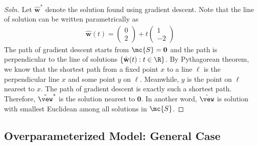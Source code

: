 \documentclass{article}
\begin{document}
	\subsubsection{}
	\begin{proof}[Soln]
		Let $\hat{\textbf{w}}^*$ denote the solution found using gradient descent. Note that the line of solution can be written parametrically as
		\begin{align}
			\hat{\textbf{w}}(t) = \begin{pmatrix}
				0 \\ 2
			\end{pmatrix} + t \begin{pmatrix}
				1 \\ -2
			\end{pmatrix}
		\end{align}
		The path of gradient descent starts from $\mc{S} = \textbf{0}$ and the path is perpendicular to the line of solutions $\{\hat{\textbf{w}}(t): t \in \R\}$. By  Pythagorean theorem, we know that the shortest path from a fixed point $x$ to a line $\ell$ is the perpendicular line $x$ and some point $y$ on $\ell$. Meanwhile, $y$ is the point on $\ell$ nearest to $x$. The path of gradient descent is exactly such a shortest path. Therefore, $\hat{\vew}^*$ is the solution nearest to $\textbf{0}$. In another word, $\hat{\vew}$ is solution with smallest Euclidean among all solutions in $\mc{S}$.
	\end{proof}
	
	\subsection{Overparameterized Model: General Case}
\end{document}
